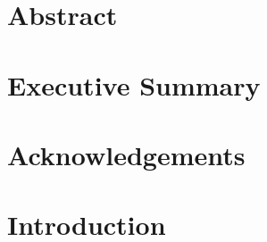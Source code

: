 \documentclass[12pt, oneside]{book}
\begin{document}
\frontmatter 



\chapter{Abstract}

\chapter{Executive Summary}


\chapter{Acknowledgements}


\tableofcontents

\listoffigures

\mainmatter

\chapter{Introduction}

\end{document}
